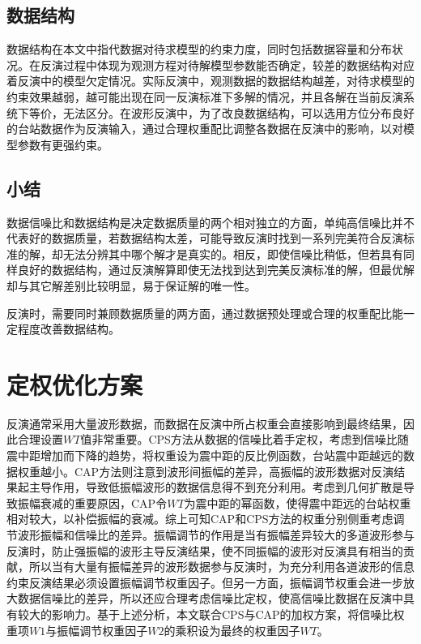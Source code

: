 \subsection{数据结构}

数据结构在本文中指代数据对待求模型的约束力度，同时包括数据容量和分布状况。在反演过程中体现为观测方程对待解模型参数能否确定，较差的数据结构对应着反演中的模型欠定情况。实际反演中，观测数据的数据结构越差，对待求模型的约束效果越弱，越可能出现在同一反演标准下多解的情况，并且各解在当前反演系统下等价，无法区分。在波形反演中，为了改良数据结构，可以选用方位分布良好的台站数据作为反演输入，通过合理权重配比调整各数据在反演中的影响，以对模型参数有更强约束。

\subsection{小结}

数据信噪比和数据结构是决定数据质量的两个相对独立的方面，单纯高信噪比并不代表好的数据质量，若数据结构太差，可能导致反演时找到一系列完美符合反演标准的解，却无法分辨其中哪个解才是真实的。相反，即使信噪比稍低，但若具有同样良好的数据结构，通过反演解算即使无法找到达到完美反演标准的解，但最优解却与其它解差别比较明显，易于保证解的唯一性。

反演时，需要同时兼顾数据质量的两方面，通过数据预处理或合理的权重配比能一定程度改善数据结构。

\section{定权优化方案}

反演通常采用大量波形数据，而数据在反演中所占权重会直接影响到最终结果，因此合理设置$WT$值非常重要。CPS方法从数据的信噪比着手定权，考虑到信噪比随震中距增加而下降的趋势，将权重设为震中距的反比例函数，台站震中距越远的数据权重越小。CAP方法\citep{Zhu1996}则注意到波形间振幅的差异，高振幅的波形数据对反演结果起主导作用，导致低振幅波形的数据信息得不到充分利用。考虑到几何扩散是导致振幅衰减的重要原因，CAP令$WT$为震中距的幂函数，使得震中距远的台站权重相对较大，以补偿振幅的衰减。综上可知CAP和CPS方法的权重分别侧重考虑调节波形振幅和信噪比的差异。振幅调节的作用是当有振幅差异较大的多道波形参与反演时，防止强振幅的波形主导反演结果，使不同振幅的波形对反演具有相当的贡献，所以当有大量有振幅差异的波形数据参与反演时，为充分利用各道波形的信息约束反演结果必须设置振幅调节权重因子。但另一方面，振幅调节权重会进一步放大数据信噪比的差异，所以还应合理考虑信噪比定权，使高信噪比数据在反演中具有较大的影响力。基于上述分析，本文联合CPS与CAP的加权方案，将信噪比权重项$W1$与振幅调节权重因子$W2$的乘积设为最终的权重因子$WT$。

